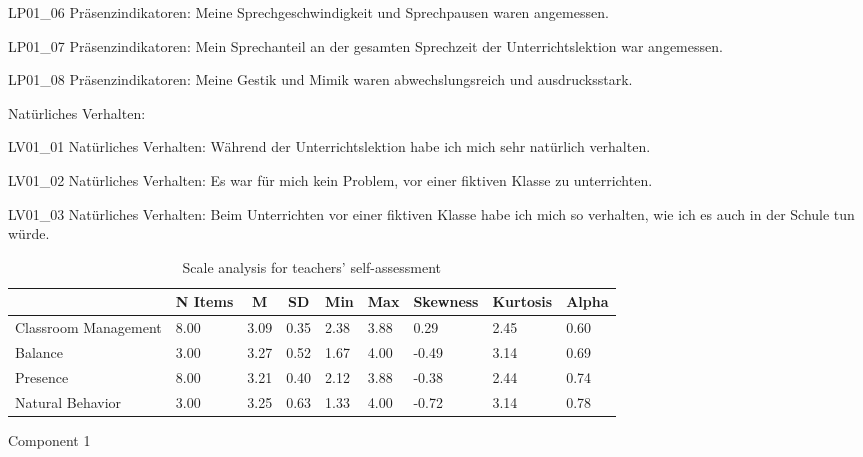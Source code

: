 \documentclass[
]{article}
\begin{document}
LP01\_06 Präsenzindikatoren: Meine Sprechgeschwindigkeit und
Sprechpausen waren angemessen.

LP01\_07 Präsenzindikatoren: Mein Sprechanteil an der gesamten
Sprechzeit der Unterrichtslektion war angemessen.

LP01\_08 Präsenzindikatoren: Meine Gestik und Mimik waren
abwechslungsreich und ausdrucksstark.

Natürliches Verhalten:

LV01\_01 Natürliches Verhalten: Während der Unterrichtslektion habe ich
mich sehr natürlich verhalten.

LV01\_02 Natürliches Verhalten: Es war für mich kein Problem, vor einer
fiktiven Klasse zu unterrichten.

LV01\_03 Natürliches Verhalten: Beim Unterrichten vor einer fiktiven
Klasse habe ich mich so verhalten, wie ich es auch in der Schule tun
würde.

\begin{table}[h]

\begin{center}
\begin{threeparttable}

\caption{\label{tab:presence_questionnaire}Scale analysis for teachers' self-assessment}

\tiny{

\begin{tabular}{lllllllll}
\toprule
 & \multicolumn{1}{c}{N Items} & \multicolumn{1}{c}{M} & \multicolumn{1}{c}{SD} & \multicolumn{1}{c}{Min} & \multicolumn{1}{c}{Max} & \multicolumn{1}{c}{Skewness} & \multicolumn{1}{c}{Kurtosis} & \multicolumn{1}{c}{Alpha}\\
\midrule
Classroom Management & 8.00 & 3.09 & 0.35 & 2.38 & 3.88 & 0.29 & 2.45 & 0.60\\
Balance & 3.00 & 3.27 & 0.52 & 1.67 & 4.00 & -0.49 & 3.14 & 0.69\\
Presence & 8.00 & 3.21 & 0.40 & 2.12 & 3.88 & -0.38 & 2.44 & 0.74\\
Natural Behavior & 3.00 & 3.25 & 0.63 & 1.33 & 4.00 & -0.72 & 3.14 & 0.78\\
\bottomrule
\end{tabular}

}

\end{threeparttable}
\end{center}

\end{table}

Component 1
\end{document}
